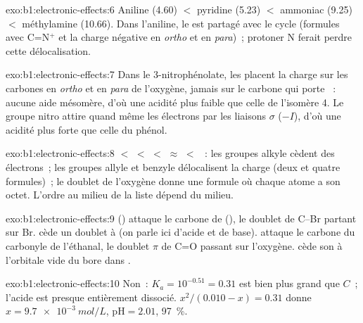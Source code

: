 \begin{solution}{exo:b1:electronic-effects:6}
Aniline (4.60) $<$ pyridine (5.23) $<$ ammoniac (9.25) $<$ méthylamine
(10.66). Dans l'aniline, le  est partagé avec le cycle
(formules avec C=N$^+$ et la charge négative en \textit{ortho} et en
\textit{para})~; protoner N ferait perdre cette délocalisation.
\end{solution}

\begin{solution}{exo:b1:electronic-effects:7}
Dans le 3-nitrophénolate, les  placent la charge sur
les carbones en \textit{ortho} et en \textit{para} de l'oxygène, jamais
sur le carbone qui porte ~: aucune aide mésomère, d'où une
acidité plus faible que celle de l'isomère 4. Le groupe nitro attire
quand même les électrons par les liaisons $\sigma$ ($-I$), d'où une
acidité plus forte que celle du phénol.
\end{solution}

\begin{solution}{exo:b1:electronic-effects:8}
 $<$  $<$  $<$ 
$\approx$  $<$ ~: les groupes alkyle cèdent
des électrons~; les groupes allyle et benzyle délocalisent la charge
(deux et quatre formules)~; le doublet de l'oxygène donne une formule où
chaque atome a son octet. L'ordre au milieu de la liste dépend du
milieu.
\end{solution}

\begin{solution}{exo:b1:electronic-effects:9}
 () attaque le carbone de  (),
le doublet de C--Br partant sur Br.  cède un doublet à 
(on parle ici d'acide et de base).  attaque le carbone du
carbonyle de l'éthanal, le doublet $\pi$ de C=O passant sur l'oxygène.
 cède son  à l'orbitale vide du bore dans
.
\end{solution}

\begin{solution}{exo:b1:electronic-effects:10}
Non~: $K_a = 10^{-0.51} = 0.31$ est bien plus grand que $C$~; l'acide
est presque entièrement dissocié. $x^2/(0.010 - x) = 0.31$ donne
$x = \qty{9.7e-3}{mol/L}$, $\mathrm{pH} = 2.01$,  \qty{97}{\percent}.
\end{solution}

